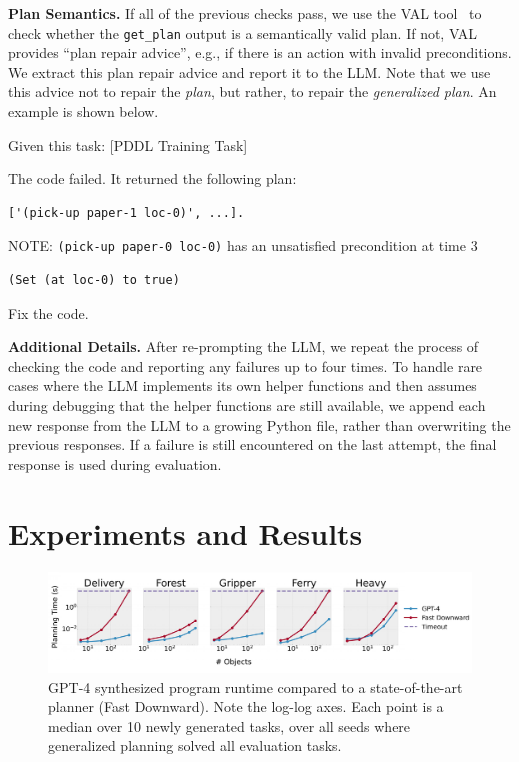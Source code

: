 \documentclass[letterpaper]{article} %
\begin{document}
\textbf{Plan Semantics.}
If all of the previous checks pass, we use the VAL tool~\cite{howey2004val} to check whether the \texttt{get\_plan} output is a semantically valid plan.
If not, VAL provides ``plan repair advice'', e.g., if there is an action with invalid preconditions.
We extract this plan repair advice and report it to the LLM.
Note that we use this advice not to repair the \textit{plan}, but rather, to repair the \emph{generalized plan}.
An example is shown below.

\begin{tcolorbox}[left=2pt,right=2pt]
Given this task: [PDDL Training Task]

The code failed. It returned the following plan:
\begin{verbatim}
['(pick-up paper-1 loc-0)', ...].
\end{verbatim}
NOTE: \texttt{(pick-up paper-0 loc-0)} has an unsatisfied precondition at time 3
\begin{verbatim}
(Set (at loc-0) to true)
\end{verbatim}
Fix the code.
\end{tcolorbox}

\textbf{Additional Details.}
After re-prompting the LLM, we repeat the process of checking the code and reporting any failures up to four times.
To handle rare cases where the LLM implements its own helper functions and then assumes during debugging that the helper functions are still available, we append each new response from the LLM to a growing Python file, rather than overwriting the previous responses.
If a failure is still encountered on the last attempt, the final response is used during evaluation.

\section{Experiments and Results}



\begin{figure}[t]
    \includegraphics[width=1.0\textwidth,trim={0 0.5cm 0 0},clip]{problem_size_analysis.pdf}
    \caption{GPT-4 synthesized program runtime compared to a state-of-the-art planner (Fast Downward). Note the log-log axes.
    Each point is a median over 10 newly generated tasks, over all seeds where generalized planning solved all evaluation tasks.}
    \label{fig:problem_size}
\end{figure}
\end{document}
